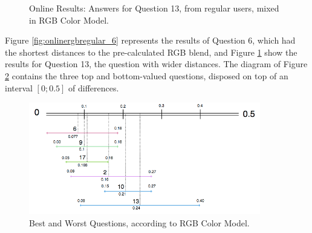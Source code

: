 \begin{figure}[!htbp]
\begin{minipage}{0.48\textwidth}
    \caption[Online Results: Answers for Question 13, from regular users, mixed in RGB Color Model.]{Online Results: Answers for Question 13, from regular users, mixed in RGB Color Model.}
    \label{fig:onlinergbregular_13}
  \end{minipage}
\end{figure}
%
Figure \ref{fig:onlinergbregular_6} represents the results of Question 6, which had the shortest distances to the pre-calculated RGB blend, and Figure \ref{fig:onlinergbregular_13} show the results for Question 13, the question with wider
distances. The diagram of Figure \ref{fig:rgb_analysis} contains the three top and bottom-valued questions, disposed on top of an interval $[0 ; 0.5]$ of differences. \par
%
\begin{figure}[!htbp]
  \centering
  \includegraphics[width=0.9\textwidth]{images/results/rgb_questions_analysis.png}
  \caption[Best and Worst Questions, according RGB Color Model.]{Best and Worst Questions, according to RGB Color Model.}
  \label{fig:rgb_analysis}
\end{figure}
%
%
